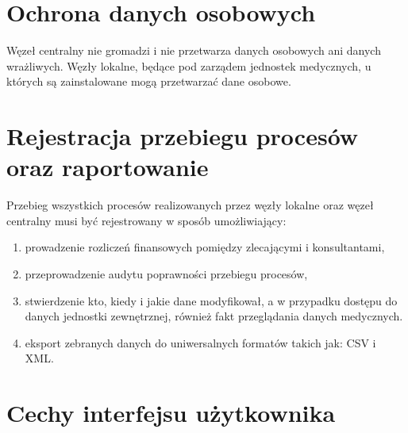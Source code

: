 \documentclass[a4paper]{report}
\begin{document}
\section{Ochrona danych osobowych}

Węzeł centralny nie gromadzi i nie przetwarza danych osobowych ani danych wrażliwych. Węzły lokalne, będące pod zarządem jednostek medycznych, u których są zainstalowane mogą przetwarzać dane osobowe.

\section{Rejestracja przebiegu procesów oraz raportowanie}

Przebieg wszystkich procesów realizowanych przez węzły lokalne oraz węzeł 
centralny musi być rejestrowany w sposób umożliwiający: 
\begin{enumerate}
  \item prowadzenie rozliczeń finansowych pomiędzy zlecającymi i konsultantami,
  \item przeprowadzenie audytu poprawności przebiegu procesów,
  \item stwierdzenie kto, kiedy i jakie dane modyfikował, a w przypadku dostępu do danych
  jednostki zewnętrznej, również fakt przeglądania danych medycznych.
  \item eksport zebranych danych do uniwersalnych formatów takich jak: CSV i XML.
\end{enumerate}

\section{Cechy interfejsu użytkownika}
\end{document}
